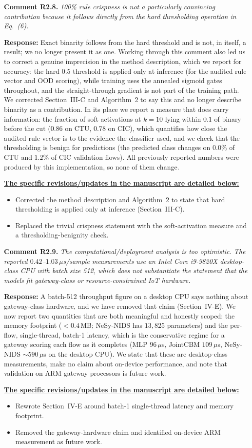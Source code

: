 \documentclass[11pt]{article}
\newcommand{\cmt}[2]{\medskip\noindent\textbf{Comment #1.} \textit{#2}\par}
\newcommand{\resp}{\smallskip\par\noindent\textbf{Response:} }
\newcommand{\revs}{\smallskip\par\noindent\underline{\textbf{The specific revisions/updates in the manuscript are detailed below:}}\par}
\begin{document}
\cmt{R2.8}{100\% rule crispness is not a particularly convincing contribution
because it follows directly from the hard thresholding operation in Eq.~(6).}
\resp Exact binarity follows from the hard threshold and is not, in itself, a
result; we no longer present it as one. Working through this comment also led us to
correct a genuine imprecision in the method description, which we report for
accuracy: the hard $0.5$ threshold is applied only at inference (for the audited
rule vector and OOD scoring), while training uses the annealed sigmoid gates
throughout, and the straight-through gradient is not part of the training path. We
corrected Section~III-C and Algorithm~2 to say this and no longer describe
binarity as a contribution. In its place we report a measure that does carry
information: the fraction of soft activations at $k{=}10$ lying within $0.1$ of
binary before the cut ($0.86$ on CTU, $0.78$ on CIC), which quantifies how close
the audited rule vector is to the evidence the classifier used, and we check that
the thresholding is benign for predictions (the predicted class changes on $0.0\%$
of CTU and $1.2\%$ of CIC validation flows). All previously reported numbers were
produced by this implementation, so none of them change.
\revs
\begin{itemize}
  \item Corrected the method description and Algorithm~2 to state that hard
  thresholding is applied only at inference (Section~III-C).
  \item Replaced the trivial crispness statement with the soft-activation measure
  and a thresholding-benignity check.
\end{itemize}

\cmt{R2.9}{The computational/deployment analysis is too optimistic. The reported
$0.42$--$1.03$\,$\mu$s/sample measurements use an Intel Core i9-9820X desktop-class
CPU with batch size 512, which does not substantiate the statement that the
models fit gateway-class or resource-constrained IoT hardware.}
\resp A batch-512 throughput figure on a desktop CPU says nothing about
gateway-class hardware, and we have removed that claim (Section~IV-E). We now
report two quantities that are both meaningful and honestly scoped: the memory
footprint ($<0.4$\,MB; NeSy-NIDS has $13{,}825$ parameters) and the per-flow,
single-thread, batch-1 latency, which is the conservative regime for a gateway
scoring each flow as it completes (MLP $96$\,$\mu$s, JointCBM $109$\,$\mu$s,
NeSy-NIDS ${\sim}590$\,$\mu$s on the desktop CPU). We state that these are
desktop-class measurements, make no claim about on-device performance, and note
that validation on ARM gateway processors is future work.
\revs
\begin{itemize}
  \item Rewrote Section~IV-E around batch-1 single-thread latency and memory
  footprint.
  \item Removed the gateway-hardware claim and identified on-device ARM
  measurement as future work.
\end{itemize}
\end{document}

